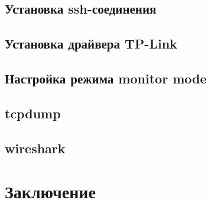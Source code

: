 \subsection{Установка ssh-соединения}

\subsection{Установка драйвера TP-Link}

\subsection{Настройка режима monitor mode}

\subsection{tcpdump}
%
\subsection{wireshark}
%



\newpage
{}
\setcounter{section}{0}
\section*{Заключение}



\clearpage
\renewcommand{\refname}{Список использованных источников}



